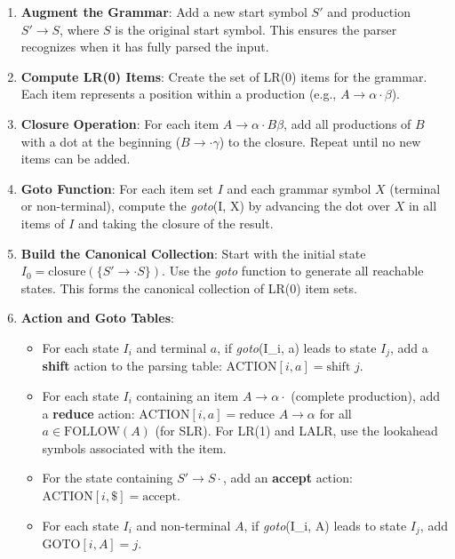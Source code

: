 \begin{enumerate}
  \item \textbf{Augment the Grammar}: Add a new start symbol \(S'\) and production \(S' \to S\), where \(S\) is the original start symbol. This ensures the parser recognizes when it has fully parsed the input.

  \item \textbf{Compute LR(0) Items}: Create the set of LR(0) items for the grammar. Each item represents a position within a production (e.g., \(A \to \alpha \cdot \beta\)). 

  \item \textbf{Closure Operation}: For each item \(A \to \alpha \cdot B \beta\), add all productions of \(B\) with a dot at the beginning (\(B \to \cdot \gamma\)) to the closure. Repeat until no new items can be added.

  \item \textbf{Goto Function}: For each item set \(I\) and each grammar symbol \(X\) (terminal or non-terminal), compute the \textit{goto}(I, X) by advancing the dot over \(X\) in all items of \(I\) and taking the closure of the result.

  \item \textbf{Build the Canonical Collection}: Start with the initial state \(I_0 = \text{closure}(\{S' \to \cdot S\})\). Use the \textit{goto} function to generate all reachable states. This forms the canonical collection of LR(0) item sets.

  \item \textbf{Action and Goto Tables}:
  \begin{itemize}
    \item For each state \(I_i\) and terminal \(a\), if \textit{goto}(I_i, a) leads to state \(I_j\), add a \textbf{shift} action to the parsing table: \(\text{ACTION}[i, a] = \text{shift } j\).
    \item For each state \(I_i\) containing an item \(A \to \alpha \cdot\) (complete production), add a \textbf{reduce} action: \(\text{ACTION}[i, a] = \text{reduce } A \to \alpha\) for all \(a \in \text{FOLLOW}(A)\) (for SLR). For LR(1) and LALR, use the lookahead symbols associated with the item.
    \item For the state containing \(S' \to S \cdot\), add an \textbf{accept} action: \(\text{ACTION}[i, \$] = \text{accept}\).
    \item For each state \(I_i\) and non-terminal \(A\), if \textit{goto}(I_i, A) leads to state \(I_j\), add \(\text{GOTO}[i, A] = j\).
  \end{itemize}


\end{enumerate}
